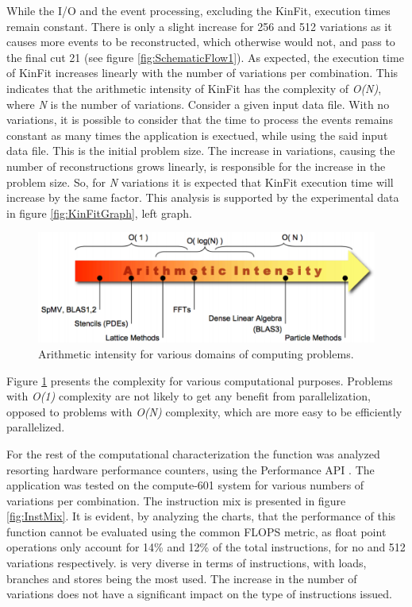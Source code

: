 While the I/O and the event processing, excluding the KinFit, execution times remain constant. There is only a slight increase for 256 and 512 variations as it causes more events to be reconstructed, which otherwise would not, and pass to the final cut 21 (see figure \ref{fig:SchematicFlow1}). As expected, the execution time of KinFit increases linearly with the number of variations per combination. This indicates that the arithmetic intensity of KinFit has the complexity of \textit{O(N)}, where \textit{N} is the number of variations. Consider a given input data file. With no variations, it is possible to consider that the time to process the events remains constant as many times the application is exectued, while using the said input data file. This is the initial problem size. The increase in variations, causing the number of reconstructions grows linearly, is responsible for the increase in the problem size. So, for \textit{N} variations it is expected that KinFit execution time will increase by the same factor. This analysis is supported by the experimental data in figure \ref{fig:KinFitGraph}, left graph.

\begin{figure}[!htp]
	\begin{center}
		\includegraphics[scale=0.6]{../../common/img/arithmetic_intensity.png}  
		\caption{Arithmetic intensity for various domains of computing problems.}
		\label{fig:ArithmeticIntensity}
	\end{center}
\end{figure}

Figure \ref{fig:ArithmeticIntensity} presents the complexity for various computational purposes. Problems with \textit{O(1)} complexity are not likely to get any benefit from parallelization, opposed to problems with \textit{O(N)} complexity, which are more easy to be efficiently parallelized.

For the rest of the computational characterization the \ttDilepKinFit function was analyzed resorting hardware performance counters, using the Performance API \cite{PAPI}. The application was tested on the compute-601 system for various numbers of variations per combination. The instruction mix is presented in figure \ref{fig:InstMix}. It is evident, by analyzing the charts, that the performance of this function cannot be evaluated using the common FLOPS metric, as float point operations only account for 14\% and 12\% of the total instructions, for no and 512 variations respectively. \ttDilepKinFit is very diverse in terms of instructions, with loads, branches and stores being the most used. The increase in the number of variations does not have a significant impact on the type of instructions issued.

